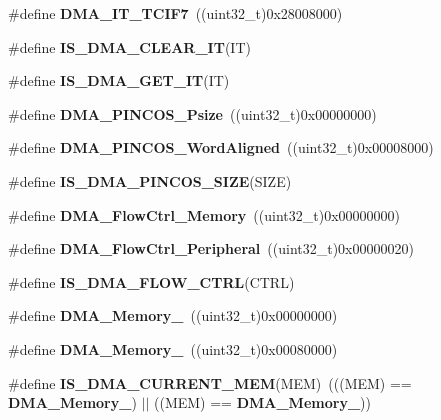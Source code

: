 \begin{DoxyCompactItemize}
\item 
\#define \textbf{ D\+M\+A\+\_\+\+I\+T\+\_\+\+T\+C\+I\+F7}~((uint32\+\_\+t)0x28008000)
\item 
\#define \textbf{ I\+S\+\_\+\+D\+M\+A\+\_\+\+C\+L\+E\+A\+R\+\_\+\+IT}(IT)
\item 
\#define \textbf{ I\+S\+\_\+\+D\+M\+A\+\_\+\+G\+E\+T\+\_\+\+IT}(IT)
\item 
\#define \textbf{ D\+M\+A\+\_\+\+P\+I\+N\+C\+O\+S\+\_\+\+Psize}~((uint32\+\_\+t)0x00000000)
\item 
\#define \textbf{ D\+M\+A\+\_\+\+P\+I\+N\+C\+O\+S\+\_\+\+Word\+Aligned}~((uint32\+\_\+t)0x00008000)
\item 
\#define \textbf{ I\+S\+\_\+\+D\+M\+A\+\_\+\+P\+I\+N\+C\+O\+S\+\_\+\+S\+I\+ZE}(S\+I\+ZE)
\item 
\#define \textbf{ D\+M\+A\+\_\+\+Flow\+Ctrl\+\_\+\+Memory}~((uint32\+\_\+t)0x00000000)
\item 
\#define \textbf{ D\+M\+A\+\_\+\+Flow\+Ctrl\+\_\+\+Peripheral}~((uint32\+\_\+t)0x00000020)
\item 
\#define \textbf{ I\+S\+\_\+\+D\+M\+A\+\_\+\+F\+L\+O\+W\+\_\+\+C\+T\+RL}(C\+T\+RL)
\item 
\#define \textbf{ D\+M\+A\+\_\+\+Memory\+\_}~((uint32\+\_\+t)0x00000000)
\item 
\#define \textbf{ D\+M\+A\+\_\+\+Memory\+\_}~((uint32\+\_\+t)0x00080000)
\item 
\#define \textbf{ I\+S\+\_\+\+D\+M\+A\+\_\+\+C\+U\+R\+R\+E\+N\+T\+\_\+\+M\+EM}(M\+EM)~(((M\+EM) == \textbf{ D\+M\+A\+\_\+\+Memory\+\_}) $\vert$$\vert$ ((M\+EM) == \textbf{ D\+M\+A\+\_\+\+Memory\+\_}))
\end{DoxyCompactItemize}
